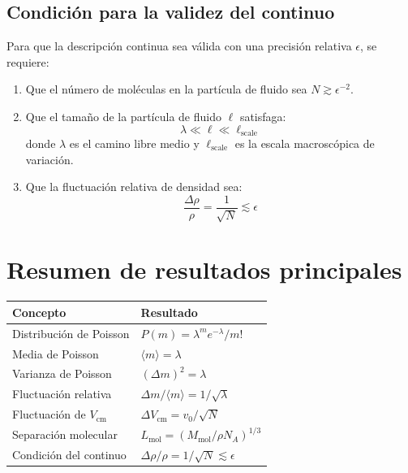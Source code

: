 \subsection{Condición para la validez del continuo}

Para que la descripción continua sea válida con una precisión relativa $\epsilon$, se requiere:
\begin{enumerate}
    \item Que el número de moléculas en la partícula de fluido sea $N \gtrsim \epsilon^{-2}$.
    \item Que el tamaño de la partícula de fluido $\ell$ satisfaga:
$$
\lambda \ll \ell \ll \ell_{\text{scale}}
$$
donde $\lambda$ es el camino libre medio y $\ell_{\text{scale}}$ es la escala macroscópica de variación.
    \item Que la fluctuación relativa de densidad sea:
$$
\frac{\Delta \rho}{\rho} = \frac{1}{\sqrt{N}} \lesssim \epsilon
$$
\end{enumerate}

\section{Resumen de resultados principales}

\begin{center}
\begin{tabular}{p{6cm} p{7cm}}
\toprule
\textbf{Concepto} & \textbf{Resultado} \\
\midrule
Distribución de Poisson & $P(m) = \lambda^m e^{-\lambda}/m!$ \\
Media de Poisson & $\langle m \rangle = \lambda$ \\
Varianza de Poisson & $(\Delta m)^2 = \lambda$ \\
Fluctuación relativa & $\Delta m / \langle m \rangle = 1/\sqrt{\lambda}$ \\
Fluctuación de $V_{\text{cm}}$ & $\Delta V_{\text{cm}} = v_0/\sqrt{N}$ \\
Separación molecular & $L_{\text{mol}} = (M_{\text{mol}}/\rho N_A)^{1/3}$ \\
Condición del continuo & $\Delta\rho/\rho = 1/\sqrt{N} \lesssim \epsilon$ \\
\bottomrule
\end{tabular}
\end{center}